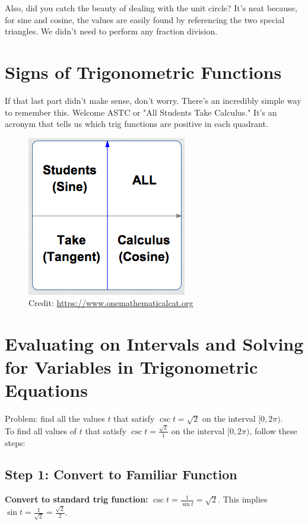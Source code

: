\documentclass[12pt]{article}
\begin{document}
Also, did you catch the beauty of dealing with the unit circle? It's neat because, for sine and cosine, the values are easily found by referencing the two special triangles. We didn't need to perform any fraction division.\\

\section{Signs of Trigonometric Functions}

If that last part didn't make sense, don't worry. There's an incredibly simple way to remember this. Welcome ASTC or "All Students Take Calculus." It's an acronym that tells us which trig functions are positive in each quadrant.\\

\begin{figure}[ht]
	\centering
	\includegraphics[scale=.75]{memoryDeviceSigns}
	\caption{Credit: \url{https://www.onemathematicalcat.org}}
\end{figure}

\section{Evaluating on Intervals and Solving for Variables in Trigonometric Equations}

Problem: find all the values \(t\) that satisfy \(\csc{t}=\sqrt{2}\) on the interval \([0,2\pi)\).\\

To find all values of \( t \) that satisfy \( \csc t = \frac{\sqrt{2}}{1} \) on the interval \( [0, 2\pi) \), follow these steps:

\subsection*{Step 1: Convert to Familiar Function}
\textbf{Convert to standard trig function:} \( \csc t = \frac{1}{\sin t} = \sqrt{2} \). This implies \( \sin t = \frac{1}{\sqrt{2}} = \frac{\sqrt{2}}{2} \).
\end{document}
